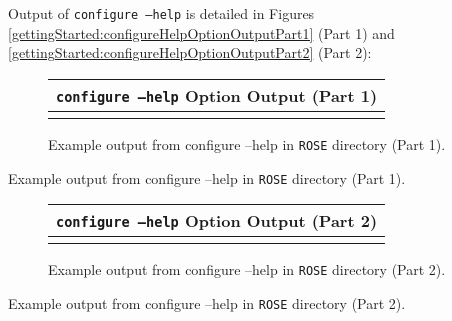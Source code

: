 Output of {\tt configure --help} is detailed in Figures 
\ref{gettingStarted:configureHelpOptionOutputPart1} (Part 1) and
\ref{gettingStarted:configureHelpOptionOutputPart2} (Part 2):
{\indent
{\mySmallestFontSize
\begin{latexonly}
\begin{figure}[tb]
\begin{center}
\begin{tabular}{|c|} \hline
     {\tt configure --help} Option Output (Part 1)
\\\hline\hline
{\tiny
   
}
\\\hline
\end{tabular}
\end{center}
\caption{ Example output from configure --help in {\tt ROSE} directory (Part 1). }
\end{figure}
\end{latexonly}

\begin{htmlonly}
   
   \vspace{0.5in}
   Example output from configure --help in {\tt ROSE} directory (Part 1).
\end{htmlonly}
\label{gettingStarted:configureHelpOptionOutputPart1}
}
}

{\indent
{\mySmallestFontSize
\begin{latexonly}
\begin{figure}[tb]
\begin{center}
\begin{tabular}{|c|} \hline
     {\tt configure --help} Option Output (Part 2)
\\\hline\hline
{\tiny
   
}
\\\hline
\end{tabular}
\end{center}
\caption{ Example output from configure --help in {\tt ROSE} directory (Part 2). }
\end{figure}
\end{latexonly}

\begin{htmlonly}
   
   \vspace{0.5in}
   Example output from configure --help in {\tt ROSE} directory (Part 2).
\end{htmlonly}
\label{gettingStarted:configureHelpOptionOutputPart2}
}
}


